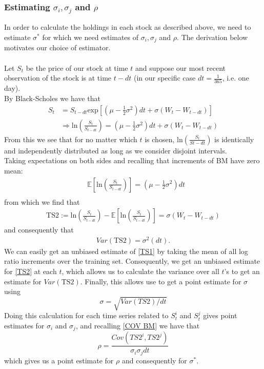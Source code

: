 \documentclass{article}
\theoremstyle{definition}
\begin{document}
\subsubsection{Estimating $\sigma_i, \sigma_j$ and $\rho$}
In order to calculate the holdings in each stock as described above, we need to estimate $\sigma^*$ for which we need estimates of $\sigma_i, \sigma_j$ and $\rho$. The derivation below motivates our choice of estimator.\\\\
Let $S_t$ be the price of our stock at time $t$ and suppose our most recent observation of the stock is at time $t-dt$ (in our specific case $dt = \frac{1}{365}$, i.e. one day). \\ \noindent By Black-Scholes we have that 
\begin{align}
 S_t &= S_{t-dt}\text{exp}\left[\left(\mu - \frac{1}{2}\sigma^2\right) dt + \sigma\left(W_t - W_{t-dt}\right)\right]\\
 &\Rightarrow \text{ln}\left(\frac{S_t}{S_{t-dt}}\right) = \left(\mu - \frac{1}{2}\sigma^2\right) dt + \sigma\left(W_t - W_{t-dt}\right)
\end{align}
From this we see that for no matter which $t$ is chosen, $\text{ln}\left(\frac{S_t}{S{t-dt}}\right)$ is identically and independently distributed as long as we consider disjoint intervals.\\
Taking expectations on both sides and recalling that increments of BM have zero mean:
\begin{align}
\label{TS1}
 &\mathbb{E}\left[\text{ln}\left(\frac{S_t}{S_{t-dt}}\right)\right] = \left(\mu - \frac{1}{2}\sigma^2\right) dt\\
\end{align}
from which we find that
\begin{align}
\label{TS2}
\text{TS2} := \text{ln}\left(\frac{S_t}{S_{t-dt}}\right) -\mathbb{E}\left[\text{ln}\left(\frac{S_t}{S_{t-dt}}\right)\right] = \sigma\left(W_t - W_{t-dt}\right)
\end{align}
and consequently that
\begin{align}
 Var(\text{TS2}) = \sigma^2(dt).
\end{align}
We can easily get an unbiased estimate of \ref{TS1} by taking the mean of all log ratio increments over the training set. Consequently, we get an unbiased estimate for \ref{TS2} at each $t$, which allows us to calculate the variance over all $t$'s to get an estimate for $Var(\text{TS2})$. Finally, this allows use to get a point estimate for $\sigma$ using
$$\sigma = \sqrt{Var(TS2)/dt}$$
Doing this calculation for each time series related to $S_t^i$ and $S_t^j$ gives point estimates for $\sigma_i$ and $\sigma_j$, and recalling \ref{COV BM} we have that
$$ \rho =\frac{Cov(TS2^i, TS2^j)}{\sigma_i \sigma_j dt}$$
which gives us a point estimate for $\rho$ and consequently for $\sigma^*.$
\end{document}
